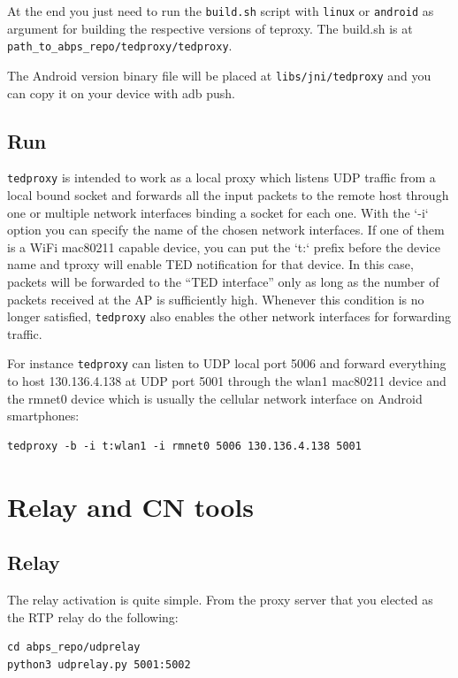 \documentclass[a4paper]{article}
\begin{document}
At the end you just need to run the \texttt{build.sh} script with \texttt{linux} or \texttt{android} as
argument for building the respective versions of teproxy. 
The build.sh is at \texttt{path\_to\_abps\_repo/tedproxy/tedproxy}.

The Android version binary file will be placed at
 \texttt{libs/jni/tedproxy} and you can 
copy it on your device with adb push.

\subsection{Run}
\texttt{tedproxy} is intended to work as a local proxy which listens UDP traffic from a
local bound socket and forwards all the input packets to the remote host through one
or multiple network interfaces binding a socket for each one. With the `-i`
option you can specify the name of the chosen network interfaces. If one of
them is a WiFi mac80211 capable device, you can put the `t:` prefix before the
device name and tproxy will enable TED notification for that device. In this
case, packets will be forwarded to the ``TED interface'' only as long as the number
of packets received at the AP is sufficiently high. Whenever this condition is
no longer satisfied, \texttt{tedproxy} also enables the other network interfaces for
forwarding traffic.

For instance \texttt{tedproxy} can listen to UDP local port 5006 and forward
everything to host 130.136.4.138 at UDP port 5001 through the wlan1
mac80211 device and the rmnet0 device which is usually the cellular network
interface on Android smartphones:

\begin{lstlisting}
tedproxy -b -i t:wlan1 -i rmnet0 5006 130.136.4.138 5001
\end{lstlisting}

\newpage
\section{Relay and CN tools}
\subsection{Relay}
The relay activation is quite simple. From the proxy server that you elected as
the RTP relay do the following:

\begin{lstlisting}
cd abps_repo/udprelay
python3 udprelay.py 5001:5002
\end{lstlisting}
\end{document}
